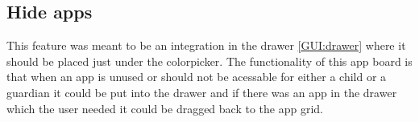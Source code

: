 \subsection*{Hide apps}
\label{backlog:hide_apps}

This feature was meant to be an integration in the drawer \autoref{GUI:drawer} where it should be placed just under the colorpicker. The functionality of this app board is that when an app is unused or should not be acessable for either a child or a guardian it could be put into the drawer and if there was an app in the drawer which the user needed it could be dragged back to the app grid.